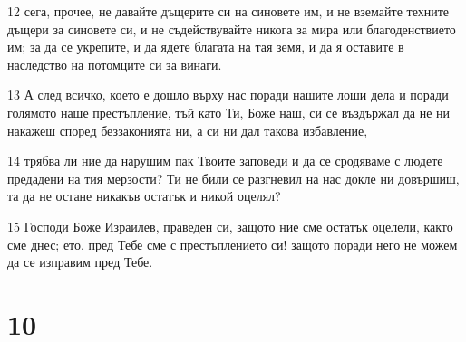 \par 12 сега, прочее, не давайте дъщерите си на синовете им, и не вземайте техните дъщери за синовете си, и не съдействувайте никога за мира или благоденствието им; за да се укрепите, и да ядете благата на тая земя, и да я оставите в наследство на потомците си за винаги.
\par 13 А след всичко, което е дошло върху нас поради нашите лоши дела и поради голямото наше престъпление, тъй като Ти, Боже наш, си се въздържал да не ни накажеш според беззаконията ни, а си ни дал такова избавление,
\par 14 трябва ли ние да нарушим пак Твоите заповеди и да се сродяваме с людете предадени на тия мерзости? Ти не били се разгневил на нас докле ни довършиш, та да не остане никакъв остатък и никой оцелял?
\par 15 Господи Боже Израилев, праведен си, защото ние сме остатък оцелели, както сме днес; ето, пред Тебе сме с престъплението си! защото поради него не можем да се изправим пред Тебе.

\chapter{10}

